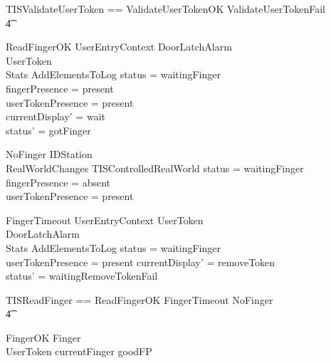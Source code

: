 \begin{zed}
        TISValidateUserToken == ValidateUserTokenOK \lor
        ValidateUserTokenFail 
\\ \t4 \lor
        [~UserTokenTorn | status = gotUserToken ]
\end{zed}

\begin{schema}{ReadFingerOK}
        UserEntryContext
\also
        \Xi DoorLatchAlarm
\\	\Xi UserToken
\\      \Xi Stats
\also
        AddElementsToLog
\where
	status = waitingFinger
\\	fingerPresence = present
\\      userTokenPresence = present
\also
\\	currentDisplay' = wait
\\	status' = gotFinger
\end{schema}

\begin{schema}{NoFinger}
        \Xi IDStation
\\      RealWorldChanges
\also
        \Xi TISControlledRealWorld
\where
        status = waitingFinger
\\      fingerPresence = absent
\\      userTokenPresence = present
\end{schema}

\begin{schema}{FingerTimeout}
        UserEntryContext
\also
        \Xi UserToken
\\      \Xi DoorLatchAlarm
\\      \Xi Stats       
\also
        AddElementsToLog
\where
        status = waitingFinger
\\      userTokenPresence = present
\also
        currentDisplay' = removeToken
\\      status' = waitingRemoveTokenFail
\end{schema}

\begin{zed}
        TISReadFinger == ReadFingerOK \lor
        FingerTimeout \lor NoFinger 
\\ \t4  \lor [~ UserTokenTorn | status = waitingFinger ~]
\end{zed}

\begin{schema}{FingerOK}
        Finger
\\      UserToken
\where
        currentFinger \in \ran goodFP
\end{schema}

